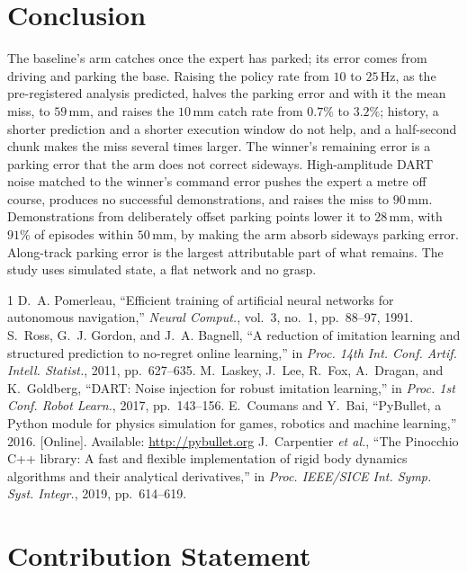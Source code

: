 \documentclass[conference]{IEEEtran}
\begin{document}
\section{Conclusion}
The baseline's arm catches once the expert has parked; its error comes from driving and parking the base. Raising the policy rate from $10$ to $25\,\mathrm{Hz}$, as the pre-registered analysis predicted, halves the parking error and with it the mean miss, to $59\,\mathrm{mm}$, and raises the $10\,\mathrm{mm}$ catch rate from $0.7\%$ to $3.2\%$; history, a shorter prediction and a shorter execution window do not help, and a half-second chunk makes the miss several times larger. The winner's remaining error is a parking error that the arm does not correct sideways. High-amplitude DART noise matched to the winner's command error pushes the expert a metre off course, produces no successful demonstrations, and raises the miss to $90\,\mathrm{mm}$. Demonstrations from deliberately offset parking points lower it to $28\,\mathrm{mm}$, with $91\%$ of episodes within $50\,\mathrm{mm}$, by making the arm absorb sideways parking error. Along-track parking error is the largest attributable part of what remains. The study uses simulated state, a flat network and no grasp.

\begin{thebibliography}{1}
D.~A. Pomerleau, ``Efficient training of artificial neural networks for autonomous navigation,'' \emph{Neural Comput.}, vol.~3, no.~1, pp.~88--97, 1991.
S.~Ross, G.~J. Gordon, and J.~A. Bagnell, ``A reduction of imitation learning and structured prediction to no-regret online learning,'' in \emph{Proc. 14th Int. Conf. Artif. Intell. Statist.}, 2011, pp.~627--635.
M.~Laskey, J.~Lee, R.~Fox, A.~Dragan, and K.~Goldberg, ``{DART}: Noise injection for robust imitation learning,'' in \emph{Proc. 1st Conf. Robot Learn.}, 2017, pp.~143--156.
E.~Coumans and Y.~Bai, ``PyBullet, a Python module for physics simulation for games, robotics and machine learning,'' 2016. [Online]. Available: \url{http://pybullet.org}
J.~Carpentier \emph{et al.}, ``The {P}inocchio {C}++ library: A fast and flexible implementation of rigid body dynamics algorithms and their analytical derivatives,'' in \emph{Proc. IEEE/SICE Int. Symp. Syst. Integr.}, 2019, pp.~614--619.
\end{thebibliography}

\clearpage
\section*{Contribution Statement}
\end{document}
